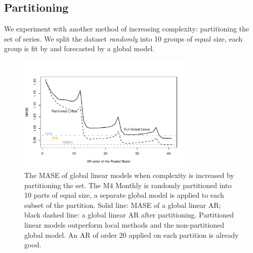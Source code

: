 \documentclass[a4paper]{article}
\theoremstyle{custom}
\begin{document}
\subsection{Partitioning}
\label{sec:exparti}

We experiment with another method of increasing complexity: partitioning the set of series. We split the dataset \textit{randomly} into 10 groups of equal size, each group is fit by and forecasted by a global model.

\begin{figure}[!htb]
  \centering
  \includegraphics[width=0.75\textwidth]{fig/partM4.pdf}
  \caption{The MASE of global linear models when complexity is increased by partitioning the set. The M4 Monthly is randomly partitioned into 10 parts of equal size, a separate global model is applied to each subset of the partition. Solid line: MASE of a global linear AR; black dashed line: a global linear AR after partitioning.  Partitioned linear models outperform local methods and the non-partitioned global model. An AR of order 20 applied on each partition is already good.}
  \label{fig:partition}
\end{figure}

\end{document}
